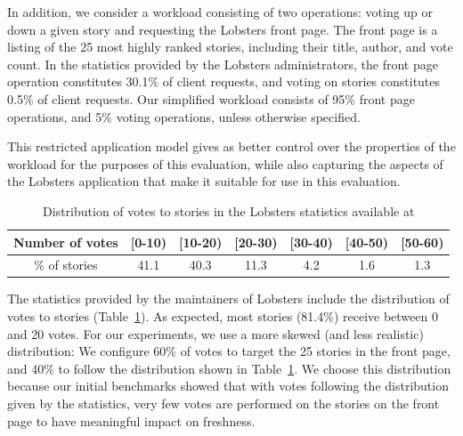In addition, we consider a workload consisting of two operations: voting up or down a given story and requesting the Lobsters
front page.
The front page is a listing of the 25 most highly ranked stories, including their title, author, and vote count.
In the statistics provided by the Lobsters administrators, the front page operation constitutes 30.1\% of client requests,
and voting on stories constitutes 0.5\% of client requests.
Our simplified workload consists of 95\% front page operations, and 5\% voting operations, unless otherwise specified.

This restricted application model gives as better control over the properties of the workload for the purposes of
this evaluation,
while also capturing the aspects of the Lobsters application that make it suitable for use in this evaluation.


\begin{table}[H]
\centering
\begin{tabular}{|c||c|c|c|c|c|c|}
\hline
Number of votes & [0-10) & [10-20) & [20-30) & [30-40) & [40-50) & [50-60) \\
\hline
\% of stories & 41.1 & 40.3 & 11.3 & 4.2 & 1.6 & 1.3 \\
\hline
\end{tabular}
\caption{Distribution of votes to stories in the Lobsters statistics available at \cite{lobste:stats}}
\label{tab:votes_per_story}
\end{table}

The statistics provided by the maintainers of Lobsters \cite{lobste:stats} include the distribution of votes to stories (Table~\ref{tab:votes_per_story}).
As expected, most stories (81.4\%) receive between 0 and 20 votes.
For our experiments, we use a more skewed (and less realistic) distribution:
We configure 60\% of votes to target the 25 stories in the front page, and 40\% to follow the distribution shown in Table~\ref{tab:votes_per_story}.
We choose this distribution because our initial benchmarks showed that with votes following the distribution given by the statistics,
very few votes are performed on the stories on the front page to have meaningful impact on freshness.

